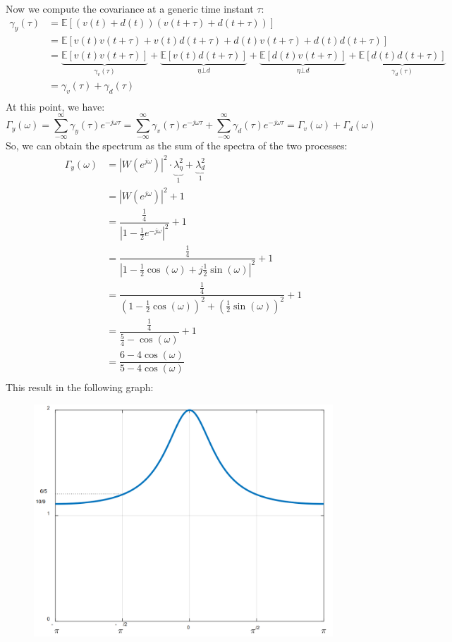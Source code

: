 Now we compute the covariance at a generic time instant $\tau$:
\begin{align*}
    \gamma_y(\tau)  &= \mathbb{E}\left[\left(v(t)+d(t)\right)\left(v(t+\tau)+d(t+\tau)\right)\right] \\
                    &= \mathbb{E}\left[v(t)v(t+\tau) + v(t)d(t+\tau) + d(t)v(t+\tau) + d(t)d(t+\tau)\right] \\
                    &= \underbrace{\mathbb{E}\left[v(t)v(t+\tau)\right]}_{\gamma_v(\tau)}  + \underbrace{\mathbb{E}\left[v(t)d(t+\tau)\right]}_{\eta \bot d}  + \underbrace{\mathbb{E}\left[d(t)v(t+\tau)\right]}_{\eta \bot d}  + \underbrace{\mathbb{E}\left[d(t)d(t+\tau)\right]}_{\gamma_d(\tau)}  \\
                    &= \gamma_v(\tau) + \gamma_d(\tau) \\
\end{align*}
At this point, we have:
\[\Gamma_y(\omega)=\sum_{-\infty}^{\infty}\gamma_y(\tau)e^{-j\omega\tau}=\sum_{-\infty}^{\infty}\gamma_v(\tau)e^{-j\omega\tau} + \sum_{-\infty}^{\infty}\gamma_d(\tau)e^{-j\omega\tau}=\Gamma_v(\omega)+\Gamma_d(\omega) \]
So, we can obtain the spectrum as the sum of the spectra of the two processes: 
\begin{align*}
    \Gamma_y(\omega)    &=\left\lvert W(e^{j\omega}) \right\rvert^2\cdot\underbrace{\lambda_\eta^2}_1 + \underbrace{\lambda_d^2}_1 \\
                        &=\left\lvert W(e^{j\omega}) \right\rvert^2 + 1 \\
                        &= \dfrac{\frac{1}{4}}{\left\lvert 1-\frac{1}{2}e^{-j\omega} \right\rvert^2} + 1\\
                        &= \dfrac{\frac{1}{4}}{\left\lvert 1-\frac{1}{2}\cos(\omega)+j\frac{1}{2}\sin(\omega)\right\rvert^2} + 1\\
                        &= \dfrac{\frac{1}{4}}{\left(1-\frac{1}{2}\cos(\omega)\right)^2 + \left(\frac{1}{2}\sin(\omega)\right)^2} + 1 \\
                        &= \dfrac{\frac{1}{4}}{\frac{5}{4} - \cos(\omega)} + 1 \\     
                        &= \dfrac{6-4\cos(\omega)}{5-4\cos(\omega)}\\                          
\end{align*}
This result in the following graph: 
\begin{figure}[H]
    \centering
    \includegraphics[width=0.5\linewidth]{images/21spec.png}
\end{figure}

